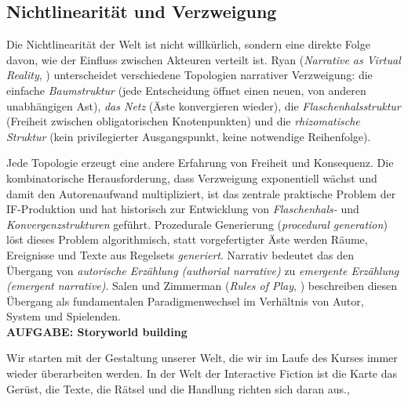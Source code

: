 \documentclass[parskip=half,a4paper,11pt]{scrreprt}
\begin{document}
\subsection{Nichtlinearität und Verzweigung}

Die Nichtlinearität der Welt ist nicht willkürlich, sondern eine direkte Folge davon, wie der Einfluss zwischen Akteuren verteilt ist. Ryan (\textit{Narrative as Virtual Reality}, \citep{Ryan2001}) unterscheidet verschiedene Topologien narrativer Verzweigung: die einfache\textit{ Baumstruktur }(jede Entscheidung öffnet einen neuen, von anderen unabhängigen Ast), \textit{das Netz} (Äste konvergieren wieder), die \textit{Flaschenhalsstruktur} (Freiheit zwischen obligatorischen Knotenpunkten) und die \textit{rhizomatische Struktur }(kein privilegierter Ausgangspunkt, keine notwendige Reihenfolge). 

Jede Topologie erzeugt eine andere Erfahrung von Freiheit und Konsequenz. Die kombinatorische Herausforderung, dass Verzweigung exponentiell wächst und damit den Autorenaufwand multipliziert, ist das zentrale praktische Problem der IF-Produktion und hat historisch zur Entwicklung von \textit{Flaschenhals-} und \textit{Konvergenzstrukturen} geführt. Prozedurale Generierung (\textit{procedural generation}) löst dieses Problem algorithmisch, statt vorgefertigter Äste werden Räume, Ereignisse und Texte aus Regelsets \textit{generiert}. Narrativ bedeutet das den Übergang von \textit{autorische Erzählung (authorial narrative)} zu \textit{emergente Erzählung (emergent narrative)}. Salen und Zimmerman (\textit{Rules of Play}, \citep{Salen2004}) beschreiben diesen Übergang als fundamentalen Paradigmenwechsel im Verhältnis von Autor, System und Spielenden.\\

\textbf{AUFGABE: Storyworld building}

Wir starten mit der Gestaltung unserer Welt, die wir im Laufe des Kurses immer wieder überarbeiten werden. In der Welt der Interactive Fiction ist die Karte das Gerüst, die Texte, die Rätsel und die Handlung richten sich daran aus.,
\end{document}
